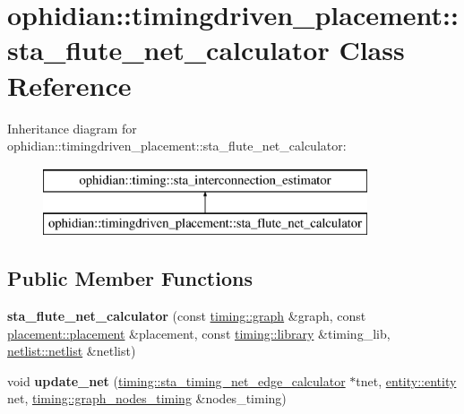 \hypertarget{classophidian_1_1timingdriven__placement_1_1sta__flute__net__calculator}{\section{ophidian\-:\-:timingdriven\-\_\-placement\-:\-:sta\-\_\-flute\-\_\-net\-\_\-calculator Class Reference}
\label{classophidian_1_1timingdriven__placement_1_1sta__flute__net__calculator}
}
Inheritance diagram for ophidian\-:\-:timingdriven\-\_\-placement\-:\-:sta\-\_\-flute\-\_\-net\-\_\-calculator\-:\begin{figure}[H]
\begin{center}
\leavevmode
\includegraphics[height=2.000000cm]{classophidian_1_1timingdriven__placement_1_1sta__flute__net__calculator}
\end{center}
\end{figure}
\subsection*{Public Member Functions}
\begin{DoxyCompactItemize}
\item 
\hypertarget{classophidian_1_1timingdriven__placement_1_1sta__flute__net__calculator_a1808197d9d2e65f6bf2ad0f82123e766}{{\bfseries sta\-\_\-flute\-\_\-net\-\_\-calculator} (const \hyperlink{classophidian_1_1timing_1_1graph}{timing\-::graph} \&graph, const \hyperlink{classophidian_1_1placement_1_1placement}{placement\-::placement} \&placement, const \hyperlink{classophidian_1_1timing_1_1library}{timing\-::library} \&timing\-\_\-lib, \hyperlink{classophidian_1_1netlist_1_1netlist}{netlist\-::netlist} \&netlist)}\label{classophidian_1_1timingdriven__placement_1_1sta__flute__net__calculator_a1808197d9d2e65f6bf2ad0f82123e766}

\item 
\hypertarget{classophidian_1_1timingdriven__placement_1_1sta__flute__net__calculator_acc32917bd68bf29470d9c5a39df64dcc}{void {\bfseries update\-\_\-net} (\hyperlink{classophidian_1_1timing_1_1sta__timing__net__edge__calculator}{timing\-::sta\-\_\-timing\-\_\-net\-\_\-edge\-\_\-calculator} $\ast$tnet, \hyperlink{classophidian_1_1entity_1_1entity}{entity\-::entity} net, \hyperlink{classophidian_1_1timing_1_1graph__nodes__timing}{timing\-::graph\-\_\-nodes\-\_\-timing} \&nodes\-\_\-timing)}\label{classophidian_1_1timingdriven__placement_1_1sta__flute__net__calculator_acc32917bd68bf29470d9c5a39df64dcc}

\end{DoxyCompactItemize}



